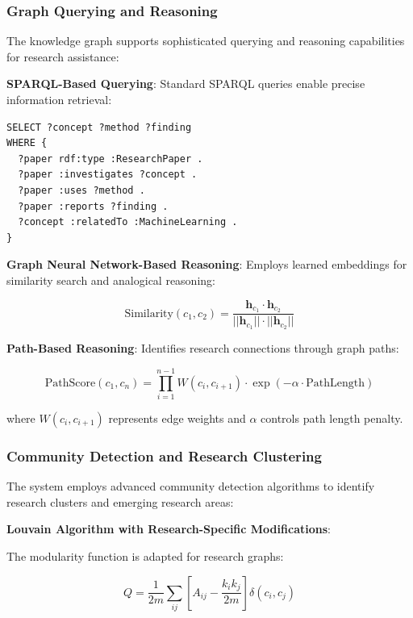 \documentclass[10pt,twocolumn]{article}
\begin{document}
\subsubsection{Graph Querying and Reasoning}

The knowledge graph supports sophisticated querying and reasoning capabilities for research assistance:

\textbf{SPARQL-Based Querying}: Standard SPARQL queries enable precise information retrieval:
\begin{verbatim}
SELECT ?concept ?method ?finding
WHERE {
  ?paper rdf:type :ResearchPaper .
  ?paper :investigates ?concept .
  ?paper :uses ?method .
  ?paper :reports ?finding .
  ?concept :relatedTo :MachineLearning .
}
\end{verbatim}

\textbf{Graph Neural Network-Based Reasoning}: Employs learned embeddings for similarity search and analogical reasoning:

\begin{equation}
\text{Similarity}(c_1, c_2) = \frac{\mathbf{h}_{c_1} \cdot \mathbf{h}_{c_2}}{||\mathbf{h}_{c_1}|| \cdot ||\mathbf{h}_{c_2}||}
\end{equation}

\textbf{Path-Based Reasoning}: Identifies research connections through graph paths:

\begin{equation}
\text{PathScore}(c_1, c_n) = \prod_{i=1}^{n-1} W(c_i, c_{i+1}) \cdot \exp(-\alpha \cdot \text{PathLength})
\end{equation}

where $W(c_i, c_{i+1})$ represents edge weights and $\alpha$ controls path length penalty.

\subsubsection{Community Detection and Research Clustering}

The system employs advanced community detection algorithms to identify research clusters and emerging research areas:

\textbf{Louvain Algorithm with Research-Specific Modifications}:

The modularity function is adapted for research graphs:

\begin{equation}
Q = \frac{1}{2m} \sum_{ij} \left[A_{ij} - \frac{k_i k_j}{2m}\right] \delta(c_i, c_j)
\end{equation}
\end{document}
